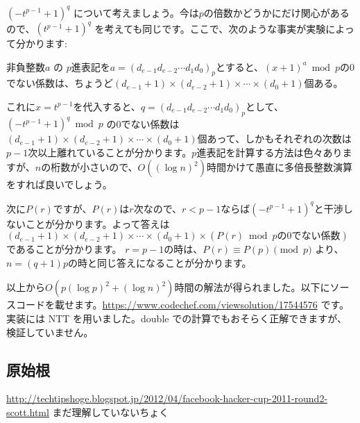 \documentclass{jsarticle}
\begin{document}
  $(-t^{p-1}+1)^q$ について考えましょう。今は$p$の倍数かどうかにだけ関心があるので、$(t^{p-1}+1)^q$ を考えても同じです。ここで、次のような事実が実験によって分かります:
  \begin{center}
   非負整数$a$ の $p$進表記を$a = (d_{e-1}d_{e-2}\cdots d_1d_0)_p$とすると、$(x+1)^a \bmod p$の0でない係数は、ちょうど$(d_{e-1} + 1) \times (d_{e-2} + 1) \times \cdots \times (d_0 + 1)$個ある。
  \end{center}
  これに$x = t^{p-1}$を代入すると、$q = (d_{e-1}d_{e-2}\cdots d_1d_0)_p$として、
  $(-t^{p-1}+1)^q \bmod p$ の0でない係数は$(d_{e-1} + 1) \times (d_{e-2} + 1) \times \cdots \times (d_0 + 1)$個あって、しかもそれぞれの次数は$p-1$次以上離れていることが分かります。$p$進表記を計算する方法は色々ありますが、$n$の桁数が小さいので、$O((\log n)^2)$時間かけて愚直に多倍長整数演算をすれば良いでしょう。

  次に$P(r)$ですが、$P(r)$は$r$次なので、$r < p - 1$ならば$(-t^{p-1}+1)^q$と干渉しないことが分かります。よって答えは$(d_{e-1} + 1) \times (d_{e-2} + 1) \times \cdots \times (d_0 + 1) \times (P(r)\bmod p\mbox{の0でない係数})$であることが分かります。
  $r = p - 1$の時は、$P(r) \equiv P(p) \pmod p$ より、$n = (q + 1)p$の時と同じ答えになることが分かります。

  以上から$O(p(\log p)^2 + (\log n)^2)$時間の解法が得られました。以下にソースコードを載せます。\url{https://www.codechef.com/viewsolution/17544576} です。
  実装には NTT を用いました。double での計算でもおそらく正解できますが、検証していません。
  
  \subsection{原始根~}
  \label{subsec:convolution-with-primitive-roots}
  \url{http://techtipshoge.blogspot.jp/2012/04/facebook-hacker-cup-2011-round2-scott.html}
  まだ理解していないちょく
\end{document}
